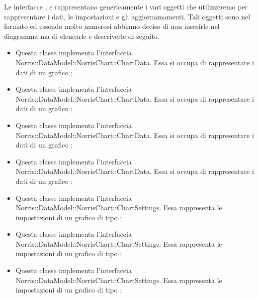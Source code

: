 	Le interfacce ,  \linebreak {} e  rappresentano genericamente i vari oggetti che utilizzeremo per rappresentare i dati, le impostazioni e gli aggiornamamenti. Tali oggetti sono nel formato  ed essendo molto numerosi abbiamo deciso di non inserirle nel diagramma ma di elencarle e descriverle di seguito.

	\begin{itemize}
		\item {} Questa classe implementa l'interfaccia Norris::DataModel::NorrisChart::ChartData. Essa si occupa di rappresentare i dati di un grafico ;

		\item {} Questa classe implementa l'interfaccia Norris::DataModel::NorrisChart::ChartData. Essa si occupa di rappresentare i dati di un grafico ;

		\item {} Questa classe implementa l'interfaccia Norris::DataModel::NorrisChart::ChartData. Essa si occupa di rappresentare i dati di un grafico ;

		\item {} Questa classe implementa l'interfaccia \linebreak Norris::DataModel::NorrisChart::ChartData. Essa si occupa di rappresentare i dati di un grafico ;

		\item {} Questa classe implementa l'interfaccia Norris::DataModel::NorrisChart::ChartSettings. Essa rappresenta le impostazioni di un grafico di tipo ;

		\item {} Questa classe implementa l'interfaccia Norris::DataModel::NorrisChart::ChartSettings. Essa rappresenta le impostazioni di un grafico di tipo ;

		\item {} Questa classe implementa l'interfaccia Norris::DataModel::NorrisChart::ChartSettings. Essa rappresenta le impostazioni di un grafico di tipo ;


\end{itemize}
